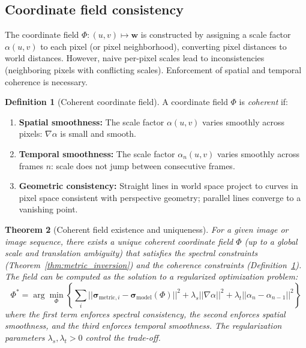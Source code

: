 \documentclass[11pt,twocolumn,a4paper]{article}
\newtheorem{theorem}{Theorem}[section]
\theoremstyle{definition}
\newtheorem{definition}[theorem]{Definition}
\begin{document}
\subsection{Coordinate field consistency}

The coordinate field $\Phi : (u,v) \mapsto \bm{w}$ is constructed by assigning a scale factor $\alpha(u,v)$ to each pixel (or pixel neighborhood), converting pixel distances to world distances. However, naive per-pixel scales lead to inconsistencies (neighboring pixels with conflicting scales). Enforcement of spatial and temporal coherence is necessary.

\begin{definition}[Coherent coordinate field]
\label{def:coherent}
A coordinate field $\Phi$ is \emph{coherent} if:
\begin{enumerate}[leftmargin=1.4em]
  \item \textbf{Spatial smoothness:} The scale factor $\alpha(u,v)$ varies smoothly across pixels: $\nabla \alpha$ is small and smooth.
  \item \textbf{Temporal smoothness:} The scale factor $\alpha_n(u,v)$ varies smoothly across frames $n$: scale does not jump between consecutive frames.
  \item \textbf{Geometric consistency:} Straight lines in world space project to curves in pixel space consistent with perspective geometry; parallel lines converge to a vanishing point.
\end{enumerate}
\end{definition}

\begin{theorem}[Coherent field existence and uniqueness]
\label{thm:coherent_exist}
For a given image or image sequence, there exists a unique coherent coordinate field $\Phi$ (up to a global scale and translation ambiguity) that satisfies the spectral constraints (Theorem~\ref{thm:metric_inversion}) and the coherence constraints (Definition~\ref{def:coherent}). The field can be computed as the solution to a regularized optimization problem:
\begin{equation}
\Phi^* = \arg\min_\Phi \left\{ \sum_{i} || \bm{\sigma}_{\text{metric},i} - \bm{\sigma}_{\text{model}}(\Phi) ||^2 + \lambda_s || \nabla \alpha ||^2 + \lambda_t || \alpha_n - \alpha_{n-1} ||^2 \right\}
\end{equation}
where the first term enforces spectral consistency, the second enforces spatial smoothness, and the third enforces temporal smoothness. The regularization parameters $\lambda_s, \lambda_t > 0$ control the trade-off.
\end{theorem}
\end{document}

